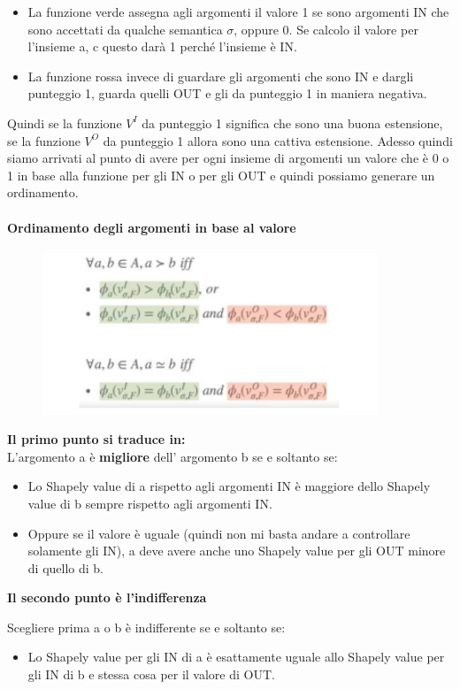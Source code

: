 \begin{itemize}
    \item La funzione verde assegna agli argomenti il valore 1 se sono
          argomenti IN che sono accettati da qualche semantica $\sigma$, oppure 0.
          Se calcolo il valore per l'insieme a, c questo darà 1 perché l'insieme è
          IN.
    \item La funzione rossa invece di guardare gli argomenti che sono IN e
          dargli punteggio 1, guarda quelli OUT e gli da punteggio 1 in maniera
          negativa.
\end{itemize}
Quindi se la funzione $V^I$ da punteggio 1 significa che sono una buona
estensione, se la funzione $V^O$ da punteggio 1 allora sono una cattiva
estensione. Adesso quindi siamo arrivati al punto di avere per ogni insieme
di argomenti un valore che è 0 o 1 in base alla funzione per gli IN o per
gli OUT e quindi possiamo generare un ordinamento.
\paragraph{Ordinamento degli argomenti in base al valore}
\begin{figure}[htp]
    \centering
    \includegraphics[width=10cm, keepaspectratio]{capitoli/img/Cap8/ordinamento-valore.png}
\end{figure}
\textbf{Il primo punto si traduce in:}
\\L'argomento a è \textbf{migliore} dell' argomento b se e soltanto se:
\begin{itemize}
    \item Lo Shapely value di a rispetto agli argomenti IN è maggiore dello
          Shapely value di b sempre rispetto agli argomenti IN.
    \item Oppure se il valore è uguale (quindi non mi basta andare a controllare
          solamente gli IN), a deve avere anche uno Shapely value per gli OUT minore
          di quello di b.
\end{itemize}
\begin{center}
    \textbf{Il secondo punto è l'indifferenza}
\end{center}
Scegliere prima a o b è indifferente se e soltanto se:
\begin{itemize}
    \item Lo Shapely value per gli IN di a è esattamente uguale allo Shapely
          value per gli IN di b e stessa cosa per il valore di OUT.
\end{itemize}
